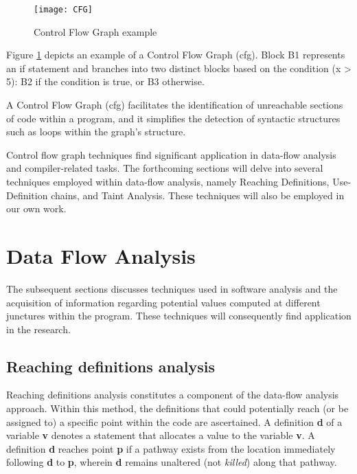 \begin{figure}[ht]
	\centering
	\texttt{[image: CFG]}
	  \caption{Control Flow Graph example}
  \label{fig:CFG_EX}
\end{figure}

Figure \ref{fig:CFG_EX} depicts an example of a Control Flow Graph (\gls{cfg}). Block B1 represents an if statement and branches into two distinct blocks based on the condition (x > 5): B2 if the condition is true, or B3 otherwise.

A Control Flow Graph (\gls{cfg}) facilitates the identification of unreachable sections of code within a program, and it simplifies the detection of syntactic structures such as loops within the graph's structure.

Control flow graph techniques find significant application in data-flow analysis and compiler-related tasks. The forthcoming sections will delve into several techniques employed within data-flow analysis, namely Reaching Definitions, Use-Definition chains, and Taint Analysis. These techniques will also be employed in our own work.


\section{Data Flow Analysis} %
\label{sec: Data_Flow_Analysis}

The subsequent sections discusses techniques used in software analysis and the acquisition of information regarding potential values computed at different junctures within the program. These techniques will consequently find application in the research.

\subsection{Reaching definitions analysis} %
\label{sec:Reaching_definitions_analysis}

Reaching definitions analysis \cite{Kronjee2018} constitutes a component of the data-flow analysis approach. Within this method, the definitions that could potentially reach (or be assigned to) a specific point within the code are ascertained. A definition \textbf{d} of a variable \textbf{v} denotes a statement that allocates a value to the variable \textbf{v}. A definition \textbf{d} reaches point \textbf{p} if a pathway exists from the location immediately following \textbf{d} to \textbf{p}, wherein \textbf{d} remains unaltered (not \textit{killed}) along that pathway. 

